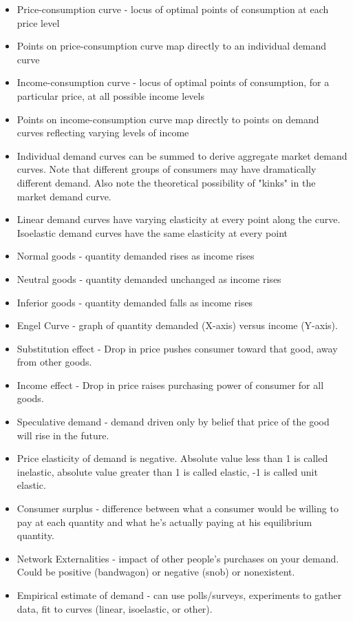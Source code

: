 \documentclass{exam}
\begin{document}
\begin{itemize}
  \item Price-consumption curve - locus of optimal points of consumption at each price level
  \item Points on price-consumption curve map directly to an individual demand curve
  \item Income-consumption curve - locus of optimal points of consumption, for a particular price, at all possible income levels
  \item Points on income-consumption curve map directly to points on demand curves reflecting varying levels of income
  \item Individual demand curves can be summed to derive aggregate market demand curves.  Note that different groups of consumers may have dramatically different demand.  Also note the theoretical possibility of "kinks" in the market demand curve.
  \item Linear demand curves have varying elasticity at every point along the curve. Isoelastic demand curves have the same elasticity at every point
  \item Normal goods - quantity demanded rises as income rises
  \item Neutral goods - quantity demanded unchanged as income rises
  \item Inferior goods - quantity demanded falls as income rises
  \item Engel Curve - graph of quantity demanded (X-axis) versus income (Y-axis).
  \item Substitution effect - Drop in price pushes consumer toward that good, away from other goods.
  \item Income effect - Drop in price raises purchasing power of consumer for all goods.
  \item Speculative demand - demand driven only by belief that price of the good will rise in the future.
  \item Price elasticity of demand is negative.  Absolute value less than 1 is called inelastic, absolute value greater than 1 is called elastic, -1 is called unit elastic.
  \item Consumer surplus - difference between what a consumer would be willing to pay at each quantity and what he's actually paying at his equilibrium quantity.
  \item Network Externalities - impact of other people's purchases on your demand.  Could be positive (bandwagon) or negative (snob) or nonexistent.
  \item Empirical estimate of demand - can use polls/surveys, experiments to gather data, fit to curves (linear, isoelastic, or other).
\end{itemize}
\end{document}
